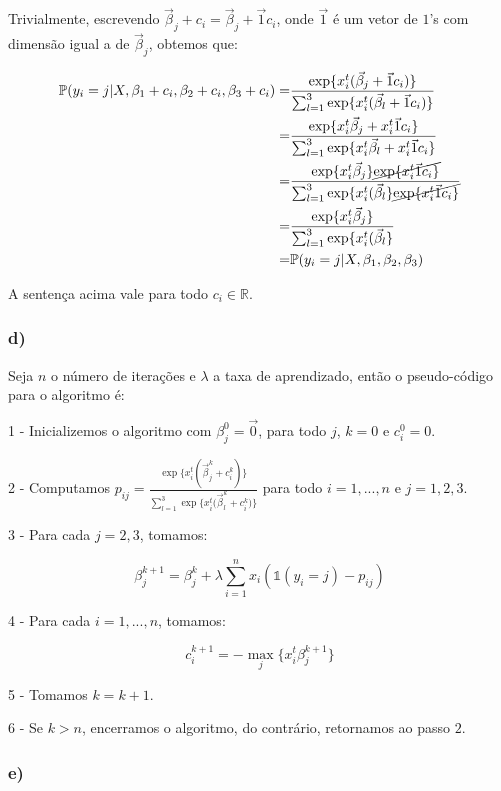 \documentclass[
]{article}
\begin{document}
Trivialmente, escrevendo
\(\vec{\beta}_j+c_i = \vec{\beta}_j+\vec{1}c_i\), onde \(\vec{1}\) é um
vetor de \(1\)'s com dimensão igual a de \(\vec{\beta}_j\), obtemos que:

\[
\begin{aligned}
\mathbb{P}(y_i=j|X,\beta_1+c_i,\beta_2+c_i,\beta_3+c_i)=&\frac{\exp\{{x_i^t(\vec{\beta}_j}+\vec{1}c_i)\}}{\sum_{l=1}^{3}\exp\{{x_i^t(\vec{\beta}_l+\vec{1}c_i)}\}}\\
=&\frac{\exp\{{x_i^t\vec{\beta}_j}+x_i^t\vec{1}c_i\}}{\sum_{l=1}^{3}\exp\{{x_i^t\vec{\beta}_l+x_i^t\vec{1}c_i}\}}\\
=&\frac{\exp\{x_i^t\vec{\beta}_j\}\cancel{\exp\{x_i^t\vec{1}c_i\}}}{\sum_{l=1}^{3}\exp\{{x_i^t(\vec{\beta}_l}\}\cancel{\exp\{x_i^t\vec{1}c_i\}}}\\
=&\frac{\exp\{x_i^t\vec{\beta}_j\}}{\sum_{l=1}^{3}\exp\{{x_i^t(\vec{\beta}_l}\}}\\
=&\mathbb{P}(y_i=j|X,\beta_1,\beta_2,\beta_3)
\end{aligned}
\]

A sentença acima vale para todo \(c_i \in \mathbb{R}\).

\hypertarget{d-1}{%
\subsubsection{d)}\label{d-1}}

Seja \(n\) o número de iterações e \(\lambda\) a taxa de aprendizado,
então o pseudo-código para o algoritmo é:

1 - Inicializemos o algoritmo com \(\beta_j^0=\vec{0}\), para todo
\(j\), \(k=0\) e \(c_i^0=0\).

2 - Computamos
\(p_{ij}=\frac{\exp\{{x_i^t(\vec{\beta}_j^{k}+c_i^k)\}}}{\sum_{l=1}^{3}\exp\{{x_i^t(\vec{\beta}_l^k}+c_i^k)\}}\)
para todo \(i=1,...,n\) e \(j=1,2,3\).

3 - Para cada \(j=2,3\), tomamos:

\[
\beta_j^{k+1}= \beta_j^k+\lambda\sum_{i=1}^nx_i(\mathds{1}(y_i=j)-p_{ij})
\]

4 - Para cada \(i=1,...,n\), tomamos:

\[c_i^{k+1}=-\max_j\{x_i^t\beta_{j}^{k+1}\}\]

5 - Tomamos \(k=k+1\).

6 - Se \(k>n\), encerramos o algoritmo, do contrário, retornamos ao
passo \(2\).

\hypertarget{e}{%
\subsubsection{e)}\label{e}}
\end{document}
